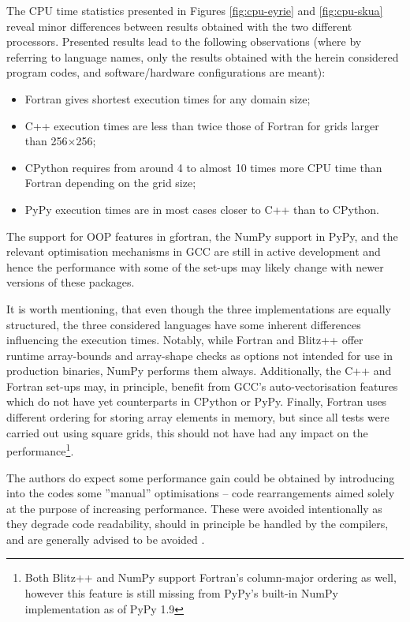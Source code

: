 \documentclass[review,peprint,10pt,5p,times]{elsarticle}
\begin{document}
  The CPU time statistics presented in Figures \ref{fig:cpu-eyrie} and \ref{fig:cpu-skua} reveal
    minor differences between results obtained with the two different processors.
  Presented results lead to the following observations
    (where by referring to language names, only the results obtained with the herein considered
     program codes, and software/hardware configurations are meant):
  \begin{itemize}
    \item{Fortran gives shortest execution times for any domain size;}
    \item{C++ execution times are less than twice those of Fortran for grids larger than 
      256$\times$256;}
    \item{CPython requires from around 4 to almost 10 times more CPU time than Fortran depending on the grid size;}
    \item{PyPy execution times are in most cases closer to C++ than to CPython.}
  \end{itemize}
  The support for OOP features in gfortran, the NumPy support in PyPy, and the relevant optimisation
    mechanisms in GCC are still in active development and hence the performance with some of the set-ups may 
    likely change with newer versions of these packages. 

  It is worth mentioning, that even though the three implementations are equally structured,
    the three considered languages have some inherent differences influencing the execution times.
  Notably, while Fortran and Blitz++ offer runtime array-bounds and array-shape checks as options
    not intended for use in production binaries, NumPy performs them always.
  Additionally, the C++ and Fortran set-ups may, in principle, benefit from GCC's auto-vectorisation
    features which do not have yet counterparts in CPython or PyPy.
  Finally, Fortran uses different ordering for storing array elements in memory, but since
    all tests were carried out using square grids, this should not have had any impact on the
    performance\footnote{Both Blitz++ and NumPy support Fortran's column-major ordering as well, 
    however this feature is still missing from PyPy's built-in NumPy implementation as of PyPy 1.9}.

  The authors do expect some performance gain could 
    be obtained by introducing into the codes some ''manual'' optimisations -- 
    code rearrangements aimed solely at the purpose of increasing performance.
  These were avoided intentionally as they degrade code readability,
    should in principle be handled by the compilers,
    and are generally advised to be avoided \citep[e.g.][section 3.12]{bib_CERNcpp}.
\end{document}
